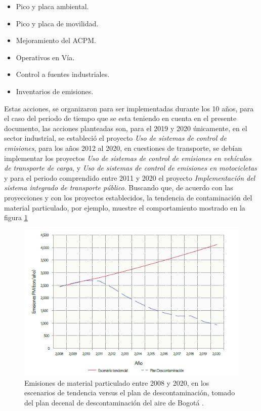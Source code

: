 \begin{itemize}
\item Pico y placa ambiental.
\item Pico y placa de movilidad. 
\item Mejoramiento del ACPM.
\item Operativos en Vía.
\item Control a fuentes industriales.
\item Inventarios de emisiones. 
\end{itemize}

Estas acciones, se organizaron para ser implementadas durante los 10 años, para el caso del periodo de tiempo que se esta teniendo en cuenta en el presente documento, las acciones planteadas son, para el 2019 y 2020 únicamente, en el sector industrial, se estableció el proyecto \textit{Uso de sistemas de control
de emisiones}, para los años 2012 al 2020, en cuestiones de transporte, se debían implementar los proyectos \textit{Uso de sistemas de control de emisiones en vehículos de transporte de carga}, y \textit{Uso de sistemas de control 
de emisiones en motocicletas} y para el periodo comprendido entre 2011 y 2020 el proyecto \textit{Implementación del sistema
integrado de transporte
público}. 
Buscando que, de acuerdo con las proyecciones y con los proyectos establecidos, la tendencia de contaminación del material particulado, por ejemplo, muestre el comportamiento mostrado en la figura \ref{proyeccionplandecenal}

\begin{figure}[hbt!]
\begin{center}
\includegraphics[width=13cm]{proyeccionplandecenal}
\end{center}
\centering
\caption{ Emisiones de material particulado entre 2008 y 2020, en los escenarios de tendencia versus el plan de descontaminación, tomado del plan decenal de descontaminación del aire de Bogotá \cite{plandecenal}. }
\label{proyeccionplandecenal}
\end{figure}

